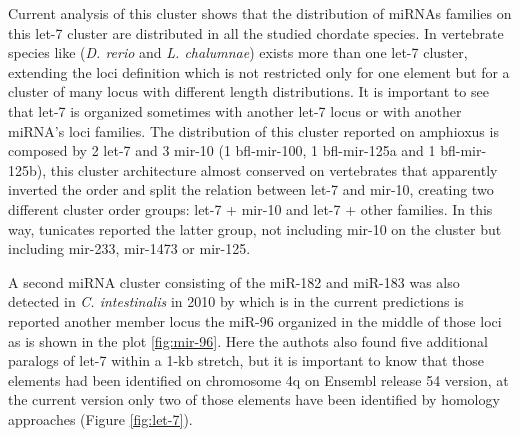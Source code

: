 \documentclass[graybox]{svmult}
\begin{document}
Current analysis of this cluster shows that the distribution of miRNAs families 
on this let-7 cluster are distributed in all the studied chordate species. In 
vertebrate species like (\textit{D. rerio} and \textit{L. chalumnae}) exists 
more than one let-7 cluster, extending the loci definition which is not 
restricted only for one element but for a cluster of many locus with different 
length distributions. It is important to see that let-7 is organized sometimes 
with another let-7 locus or with another miRNA's loci families. The distribution 
of this cluster reported on amphioxus is composed by 2 let-7 and 3 mir-10 (1 
bfl-mir-100, 1 bfl-mir-125a and 1 bfl-mir-125b), this 
cluster architecture almost conserved on vertebrates that apparently inverted 
the order and split the relation between let-7 and mir-10, creating two 
different cluster order groups: let-7 + mir-10 and let-7 + other families. 
In this way, tunicates reported the latter group, not including mir-10 on the 
cluster but including mir-233, mir-1473 or mir-125. 

A second miRNA cluster consisting of the miR-182 and miR-183 was also detected 
in \textit{C. intestinalis} in 2010 by \cite{Keshavan2010} which is in the 
current predictions is reported another member locus the miR-96 organized in the 
middle of those loci as is shown in the plot \ref{fig:mir-96}. 
Here the authots also found five additional paralogs of let-7 within a 1-kb 
stretch, but it is important to know that those elements had been identified on 
chromosome 4q on Ensembl release 54 version, at the current version only 
two of those elements have been identified by homology approaches (Figure 
\ref{fig:let-7}).


\end{document}

